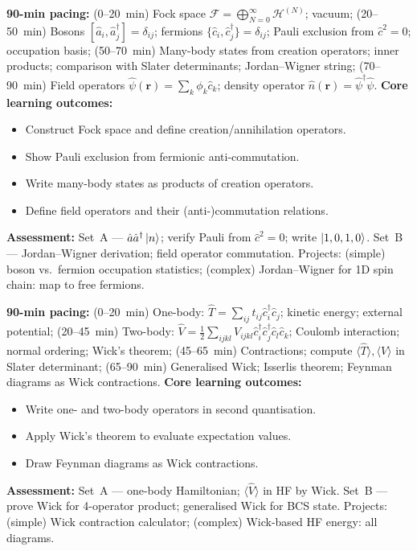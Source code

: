 \documentclass[11pt,a4paper]{article}
\begin{document}
\begin{tcolorbox}[modulebox, title={Module~II.4 / L01: Fock Space and Second Quantisation}]
\textbf{90-min pacing:} (0--20~min) Fock space $\mathcal{F}=\bigoplus_{N=0}^\infty\mathcal{H}^{(N)}$; vacuum; (20--50~min) Bosons $[\hat{a}_i,\hat{a}_j^\dagger]=\delta_{ij}$; fermions $\{\hat{c}_i,\hat{c}_j^\dagger\}=\delta_{ij}$; Pauli exclusion from $\hat{c}^2=0$; occupation basis; (50--70~min) Many-body states from creation operators; inner products; comparison with Slater determinants; Jordan--Wigner string; (70--90~min) Field operators $\hat\psi(\mathbf{r})=\sum_k\phi_k\hat{c}_k$; density operator $\hat{n}(\mathbf{r})=\hat\psi^\dagger\hat\psi$.
\medskip\textbf{Core learning outcomes:}
\begin{itemize}[leftmargin=1.4em,topsep=2pt,itemsep=1pt]
  \item Construct Fock space and define creation/annihilation operators.
  \item Show Pauli exclusion from fermionic anti-commutation.
  \item Write many-body states as products of creation operators.
  \item Define field operators and their (anti-)commutation relations.
\end{itemize}
\medskip\textbf{Assessment:}
Set~A --- $\hat{a}\hat{a}^\dagger\ket{n}$; verify Pauli from $\hat{c}^2=0$; write $\ket{1,0,1,0}$.
Set~B --- Jordan--Wigner derivation; field operator commutation.
Projects: (simple) boson vs.\ fermion occupation statistics; (complex) Jordan--Wigner for 1D spin chain: map to free fermions.
\end{tcolorbox}

\medskip

\begin{tcolorbox}[modulebox, title={Module~II.4 / L02: Operators in Second Quantisation}]
\textbf{90-min pacing:} (0--20~min) One-body: $\hat{T}=\sum_{ij}t_{ij}\hat{c}_i^\dagger\hat{c}_j$; kinetic energy; external potential; (20--45~min) Two-body: $\hat{V}=\tfrac{1}{2}\sum_{ijkl}V_{ijkl}\hat{c}_i^\dagger\hat{c}_j^\dagger\hat{c}_l\hat{c}_k$; Coulomb interaction; normal ordering; Wick's theorem; (45--65~min) Contractions; compute $\langle\hat{T}\rangle,\langle\hat{V}\rangle$ in Slater determinant; (65--90~min) Generalised Wick; Isserlis theorem; Feynman diagrams as Wick contractions.
\medskip\textbf{Core learning outcomes:}
\begin{itemize}[leftmargin=1.4em,topsep=2pt,itemsep=1pt]
  \item Write one- and two-body operators in second quantisation.
  \item Apply Wick's theorem to evaluate expectation values.
  \item Draw Feynman diagrams as Wick contractions.
\end{itemize}
\medskip\textbf{Assessment:}
Set~A --- one-body Hamiltonian; $\langle\hat{V}\rangle$ in HF by Wick.
Set~B --- prove Wick for 4-operator product; generalised Wick for BCS state.
Projects: (simple) Wick contraction calculator; (complex) Wick-based HF energy: all diagrams.
\end{tcolorbox}
\end{document}
